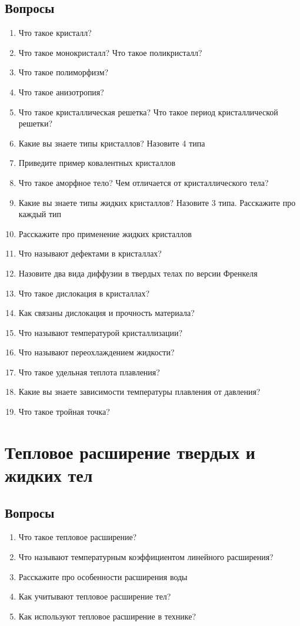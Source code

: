 \documentclass[12pt,a4paper]{report}
\begin{document}
\section{Вопросы}
\begin{enumerate}
\item Что такое кристалл?
\item Что такое монокристалл? Что такое поликристалл?
\item Что такое полиморфизм?
\item Что такое анизотропия?
\item Что такое кристаллическая решетка? Что такое период кристаллической решетки?
\item Какие вы знаете типы кристаллов? Назовите 4 типа
\item Приведите пример ковалентных кристаллов
\item Что такое аморфное тело? Чем отличается от кристаллического тела?
\item Какие вы знаете типы жидких кристаллов? Назовите 3 типа. Расскажите про каждый тип
\item Расскажите про применение жидких кристаллов
\item Что называют дефектами в кристаллах?
\item Назовите два вида диффузии в твердых телах по версии Френкеля
\item Что такое дислокация в кристаллах?
\item Как связаны дислокация и прочность материала?
\item Что называют температурой кристаллизации?
\item Что называют переохлаждением жидкости?
\item Что такое удельная теплота плавления?
\item Какие вы знаете зависимости температуры плавления от давления?
\item Что такое тройная точка?
\end{enumerate}

\chapter{Тепловое расширение твердых и жидких тел}
\section{Вопросы}
\begin{enumerate}
\item Что такое тепловое расширение?
\item Что называют температурным коэффициентом линейного расширения?
\item Расскажите про особенности расширения воды
\item Как учитывают тепловое расширение тел?
\item Как используют тепловое расширение в технике?
\end{enumerate}
\end{document}
